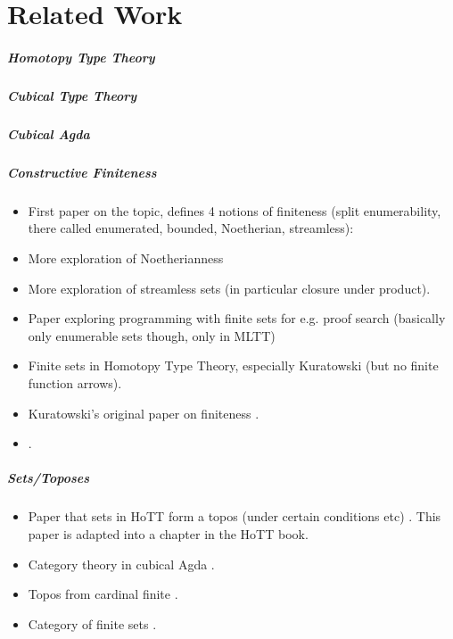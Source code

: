 \chapter{Related Work}
\paragraph{Homotopy Type Theory} \citep{hottbook}
\paragraph{Cubical Type Theory} \citep{cohenCubicalTypeTheory2016}
\paragraph{Cubical Agda} \citep{vezzosiCubicalAgdaDependently2019} 
\paragraph{Constructive Finiteness}
\begin{itemize}
  \item First paper on the topic, defines 4 notions of finiteness (split
    enumerability, there called enumerated, bounded, Noetherian, streamless):
    \citep{coquandConstructivelyFinite2010}
  \item More exploration of Noetherianness
    \citep{firsovVariationsNoetherianness2016}
  \item More exploration of streamless sets
    \citep{parmannInvestigatingStreamlessSets2015} (in particular closure under
    product).
  \item Paper exploring programming with finite sets for e.g. proof search
    \citep{firsovDependentlyTypedProgramming2015} (basically only enumerable sets
    though, only in MLTT)
  \item Finite sets in Homotopy Type Theory, especially Kuratowski
    \citep{fruminFiniteSetsHomotopy2018} (but no finite function arrows).
  \item Kuratowski's original paper on finiteness
    \citep{kuratowskiNotionEnsembleFini1920}.
  \item \citep{smolkaHereditarilyFiniteSets2016}.
\end{itemize}
\paragraph{Sets/Toposes}
\begin{itemize}
  \item Paper that sets in HoTT form a topos (under certain conditions
    etc) \citep{rijkeSetsHomotopyType2015}.
    This paper is adapted into a chapter in the HoTT book.
  \item Category theory in cubical Agda
    \citep{iversenUnivalentCategoriesFormalization2018}.
  \item Topos from cardinal finite \citep{henryToposesGeneratedCardinal2018}.
  \item Category of finite sets \citep{solovevCategoryFiniteSets1983}.
\end{itemize}
